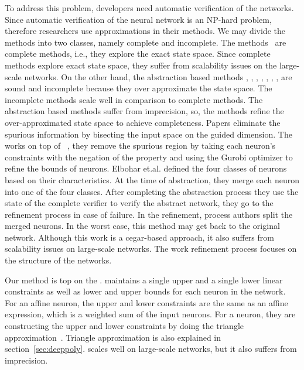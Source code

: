 To address this problem, developers need automatic verification of the networks.
Since automatic verification of the neural network is an NP-hard problem, therefore researchers use approximations in their methods.
We may divide the methods into two classes, namely complete and incomplete.
The methods~\cite{lomuscio2017approach,fischetti2018deep,dutta2018output,cheng2017maximum,katz2017reluplex,katz2019marabou,ehlers2017formal,huang2017safety,wang2021beta,xu2020fast,zhang2022general} are complete methods, i.e., they explore the exact state space.
Since complete methods explore exact state space, they suffer from scalability issues on the large-scale networks.
On the other hand, the abstraction based methods
\cite{dvijotham2018dual}, \cite{gehr2018ai2}, \cite{singh2018fast},
 \cite{singh2018boosting}, \cite{weng2018towards}, \cite{wong2018provable}, \cite{zhang2018efficient}, \cite{zhang2018efficient}
are sound and incomplete because they over approximate the state space.
The incomplete methods scale well in comparison to complete methods. 
The abstraction based methods suffer from imprecision, so, the methods
\cite{wang2018formal,wang2018efficient,elboher2020abstraction,yang2021improving,lin2020art}
refine the over-approximated state space to achieve completeness. 
Papers \cite{wang2018formal,wang2018efficient,lin2020art} eliminate the
spurious information by bisecting the input space on the guided dimension. The \cite{yang2021improving} works
on top of \deeppoly{}~\cite{singh2019abstract}, they remove
the spurious region by taking each neuron's constraints with the negation of the property and using the 
Gurobi optimizer \cite{gurobioptimizer} to refine the bounds of neurons.
Elbohar et.al. \cite{elboher2020abstraction} defined the four classes of neurons based on their characteristics.
At the time of abstraction, they merge each neuron into one of the four classes. 
After completing the abstraction process they use the state of the complete verifier to verify 
the abstract network, they go to the refinement process in case of failure.  
In the refinement, process authors split the merged neurons. 
In the worst case, this method may get back to the original network. 
Although this work is a cegar-based approach, it also suffers from scalability issues on large-scale networks.  
The work \cite{elboher2020abstraction} refinement process focuses on the structure of the networks.

Our method is top on the \deeppoly{}. 
\deeppoly{} maintains a single upper and a single lower linear constraints as well as lower and upper bounds
for each neuron in the network. For an affine neuron, the upper and lower constraints are the same as an affine expression, 
which is a weighted sum of the input neurons. For a \relu{} neuron, they are constructing the upper and lower constraints
by doing the triangle approximation~\cite{singh2019abstract}. 
Triangle approximation is also explained in section~\ref{sec:deeppoly}. 
\deeppoly{} scales well on large-scale networks, but it also suffers from imprecision. 

